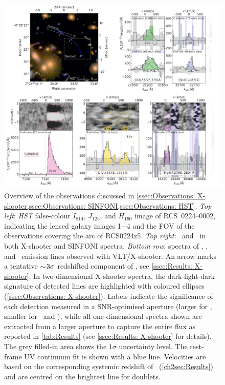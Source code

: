 \begin{figure}
    \centering
    \includegraphics[width=\linewidth]{"Plots/Chapter2/Overview_panel"}
    \caption[Overview of the observations discussed in \cref{ssec:Observations: X-shooter,ssec:Observations: SINFONI,ssec:Observations: HST}]{Overview of the observations discussed in \cref{ssec:Observations: X-shooter,ssec:Observations: SINFONI,ssec:Observations: HST}. \textit{Top left}: \textit{HST} false-colour $I_{814}$, $J_{125}$, and $H_{160}$ image of RCS~0224--0002, indicating the lensed galaxy images 1$-$4 and the FOV of the observations covering the arc of RCS0224z5. \textit{Top right}: \OII\ and \NeIII\ in both X-shooter and SINFONI spectra. \textit{Bottom row}: spectra of \lya, \CIV, and \MgII\ emission lines observed with VLT/X-shooter. An arrow marks a tentative $\sim \! 3 \sigma$ redshifted component of \CIV, see \cref{ssec:Results: X-shooter}. In two-dimensional X-shooter spectra, the dark-light-dark signature of detected lines are highlighted with coloured ellipses (\cref{ssec:Observations: X-shooter}). Labels indicate the significance of each detection measured in a SNR-optimised aperture (larger for \lya, smaller for \CIV\ and \MgII), while all one-dimensional spectra shown are extracted from a larger aperture to capture the entire flux as reported in \cref{tab:Results} (see \cref{ssec:Results: X-shooter} for details). The grey filled-in area shows the $1 \sigma$ uncertainty level. The rest-frame UV continuum fit is shown with a blue line. Velocities are based on the corresponding systemic redshift of \OII\ (\cref{ch2sec:Results}) and are centred on the brightest line for doublets.
    }
    \label{fig:Overview panel}
\end{figure}

